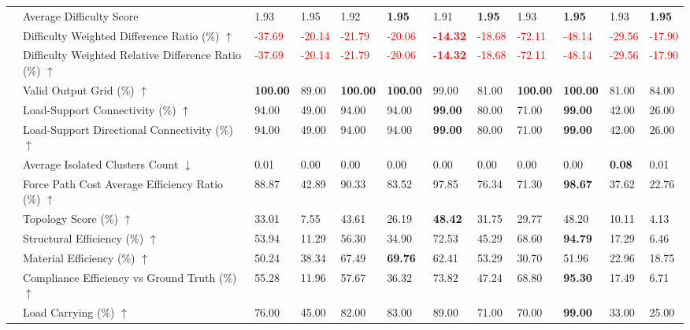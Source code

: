 \begin{table}[!h]
{\begin{tabular}{llllllllllll}
 & Average Difficulty Score & 1.93 & 1.95 & 1.92 & \textbf{1.95} & 1.91 & \textbf{1.95} & 1.93 & \textbf{1.95} & 1.93 & \textbf{1.95} \\
 & Difficulty Weighted Difference Ratio (\%) $\uparrow$ & \textcolor{red}{-37.69} & \textcolor{red}{-20.14} & \textcolor{red}{-21.79} & \textcolor{red}{-20.06} & \textbf{\textcolor{red}{-14.32}} & \textcolor{red}{-18.68} & \textcolor{red}{-72.11} & \textcolor{red}{-48.14} & \textcolor{red}{-29.56} & \textcolor{red}{-17.90} \\
 & Difficulty Weighted Relative Difference Ratio (\%) $\uparrow$ & \textcolor{red}{-37.69} & \textcolor{red}{-20.14} & \textcolor{red}{-21.79} & \textcolor{red}{-20.06} & \textbf{\textcolor{red}{-14.32}} & \textcolor{red}{-18.68} & \textcolor{red}{-72.11} & \textcolor{red}{-48.14} & \textcolor{red}{-29.56} & \textcolor{red}{-17.90} \\
 & Valid Output Grid (\%) $\uparrow$ & \textbf{100.00} & 89.00 & \textbf{100.00} & \textbf{100.00} & 99.00 & 81.00 & \textbf{100.00} & \textbf{100.00} & 81.00 & 84.00 \\
 & Load-Support Connectivity (\%) $\uparrow$ & 94.00 & 49.00 & 94.00 & 94.00 & \textbf{99.00} & 80.00 & 71.00 & \textbf{99.00} & 42.00 & 26.00 \\
 & Load-Support Directional Connectivity (\%) $\uparrow$ & 94.00 & 49.00 & 94.00 & 94.00 & \textbf{99.00} & 80.00 & 71.00 & \textbf{99.00} & 42.00 & 26.00 \\
 & Average Isolated Clusters Count $\downarrow$ & 0.01 & 0.00 & 0.00 & 0.00 & 0.00 & 0.00 & 0.00 & 0.00 & \textbf{0.08} & 0.01 \\
 & Force Path Cost Average Efficiency Ratio (\%) $\uparrow$ & 88.87 & 42.89 & 90.33 & 83.52 & 97.85 & 76.34 & 71.30 & \textbf{98.67} & 37.62 & 22.76 \\
 & Topology Score (\%) $\uparrow$ & 33.01 & 7.55 & 43.61 & 26.19 & \textbf{48.42} & 31.75 & 29.77 & 48.20 & 10.11 & 4.13 \\
 & Structural Efficiency (\%) $\uparrow$ & 53.94 & 11.29 & 56.30 & 34.90 & 72.53 & 45.29 & 68.60 & \textbf{94.79} & 17.29 & 6.46 \\
 & Material Efficiency (\%) $\uparrow$ & 50.24 & 38.34 & 67.49 & \textbf{69.76} & 62.41 & 53.29 & 30.70 & 51.96 & 22.96 & 18.75 \\
 & Compliance Efficiency vs Ground Truth (\%) $\uparrow$ & 55.28 & 11.96 & 57.67 & 36.32 & 73.82 & 47.24 & 68.80 & \textbf{95.30} & 17.49 & 6.71 \\
 & Load Carrying (\%) $\uparrow$ & 76.00 & 45.00 & 82.00 & 83.00 & 89.00 & 71.00 & 70.00 & \textbf{99.00} & 33.00 & 25.00 \\

\end{tabular}}
\end{table}
